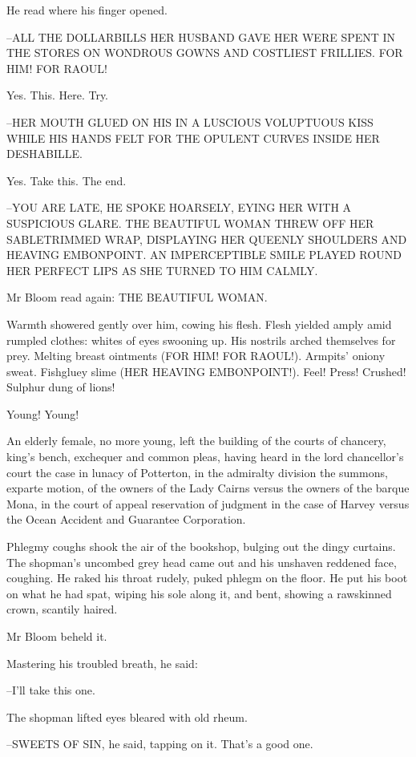 He read where his finger opened.

--ALL THE DOLLARBILLS HER HUSBAND GAVE HER
WERE SPENT IN THE STORES ON
WONDROUS GOWNS AND COSTLIEST FRILLIES.
FOR HIM!
FOR RAOUL!

Yes.
This.
Here.
Try.

--HER MOUTH GLUED ON HIS
IN A LUSCIOUS VOLUPTUOUS KISS
WHILE HIS HANDS
FELT FOR THE OPULENT CURVES INSIDE HER DESHABILLE.

Yes.
Take this.
The end.

--YOU ARE LATE,
HE SPOKE HOARSELY,
EYING HER WITH A SUSPICIOUS GLARE.
THE BEAUTIFUL WOMAN THREW OFF HER SABLETRIMMED WRAP,
DISPLAYING HER
QUEENLY SHOULDERS AND HEAVING EMBONPOINT.
AN IMPERCEPTIBLE SMILE PLAYED
ROUND HER PERFECT LIPS
AS SHE TURNED TO HIM CALMLY.

Mr Bloom read again:
THE BEAUTIFUL WOMAN.

Warmth showered gently over him,
cowing his flesh.
Flesh yielded
amply amid rumpled clothes:
whites of eyes swooning up.
His nostrils
arched themselves for prey.
Melting breast ointments
(FOR HIM!
FOR
RAOUL!).
Armpits' oniony sweat.
Fishgluey slime
(HER HEAVING EMBONPOINT!).
Feel!
Press!
Crushed!
Sulphur dung of lions!

Young!
Young!

An elderly female,
no more young,
left the building of the courts of
chancery,
king's bench,
exchequer
and common pleas,
having heard in the
lord chancellor's court
the case in lunacy of Potterton,
in the admiralty
division
the summons, exparte motion,
of the owners of the Lady Cairns
versus the owners of the barque Mona,
in the court of appeal reservation
of judgment
in the case of Harvey versus the Ocean Accident and Guarantee
Corporation.

Phlegmy coughs shook the air of the bookshop,
bulging out the dingy
curtains.
The shopman's uncombed grey head came out
and his unshaven
reddened face,
coughing.
He raked his throat rudely,
puked phlegm on the
floor.
He put his boot on what he had spat,
wiping his sole along it,
and
bent,
showing a rawskinned crown,
scantily haired.

Mr Bloom beheld it.

Mastering his troubled breath,
he said:

--I'll take this one.

The shopman lifted eyes
bleared with old rheum.

--SWEETS OF SIN,
he said,
tapping on it.
That's a good one.


